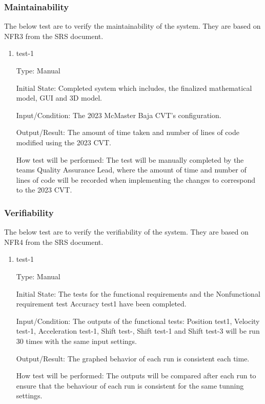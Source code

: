 \documentclass[12pt, titlepage]{article}
\begin{document}
\subsubsection{Maintainability}

The below test are to verify the maintainability of the system.
They are based on NFR3 from the SRS document.

\begin{enumerate}

\item{test-1\\}

Type: Manual
					
Initial State: Completed system which includes, the finalized mathematical model, GUI and 3D model.  
					
Input/Condition: The 2023 McMaster Baja CVT's configuration. 
					
Output/Result: The amount of time taken and number of lines of code modified using the 2023 CVT.
					
How test will be performed: The test will be manually completed by the teams Quality Assurance Lead, where the amount of time and number of lines of code will be recorded when implementing the changes to correspond to the 2023 CVT.

\end{enumerate}

\subsubsection{Verifiability}

The below test are to verify the verifiability of the system.
They are based on NFR4 from the SRS document.

\begin{enumerate}

\item{test-1\\}

Type: Manual
					
Initial State: The tests for the functional requirements and the Nonfunctional requirement test Accuracy test1 have been completed.
					
Input/Condition: The outputs of the functional tests: Position test1, Velocity test-1, Acceleration test-1, Shift test-, Shift test-1 and Shift test-3 will be run 30 times with the same input settings. 
					
Output/Result: The graphed behavior of each run is consistent each time.
					
How test will be performed: The outputs will be compared after each run to ensure that the behaviour of each run is consistent for the same tunning settings.

\end{enumerate}
\end{document}
